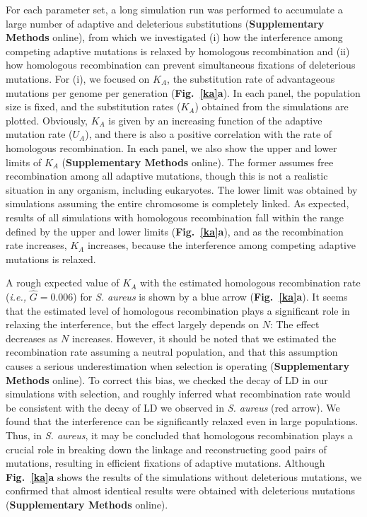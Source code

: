 \documentclass[twoside,twocolumn, letterpaper]{article}
\begin{document}
For each parameter set, a long simulation run was performed to accumulate a large number of adaptive and deleterious substitutions ({\bf Supplementary Methods} online), from which we investigated (i) how the interference among competing adaptive mutations is relaxed by homologous recombination and (ii) how homologous recombination can prevent simultaneous fixations of deleterious mutations. For (i), we focused on $K_A$, the substitution rate of advantageous mutations per genome per generation ({\bf Fig.~\ref{ka}a}). In each panel, the population size is fixed, and the substitution rates ($K_A$) obtained from the simulations are plotted. Obviously, $K_A$ is given by an increasing function of the adaptive mutation rate ($U_{A}$), and there is also a positive correlation with the rate of homologous recombination. In each panel, we also show the upper and lower limits of $K_A$ ({\bf Supplementary Methods} online). The former assumes free recombination among all adaptive mutations, though this is not a realistic situation in any organism, including eukaryotes. The lower limit was obtained by simulations assuming the entire chromosome is completely linked. As expected, results of all simulations with homologous recombination fall within the range defined by the upper and lower limits ({\bf Fig.~\ref{ka}a}), and as the recombination rate increases, $K_A$ increases, because the interference among competing adaptive mutations is relaxed. 

A rough expected value of $K_A$ with the estimated homologous recombination rate (\emph{i.e.,} $\hat{G}=0.006$) for \emph{S. aureus} is shown by a blue arrow ({\bf Fig.~\ref{ka}a}). It seems that the estimated level of homologous recombination plays a significant role in relaxing the interference, but the effect largely depends on $N$: The effect decreases as $N$ increases. However, it should be noted that we estimated the recombination rate assuming a neutral population, and that this assumption causes a serious underestimation when selection is operating ({\bf Supplementary Methods} online). To correct this bias, we checked the decay of LD in our simulations with selection, and roughly inferred what recombination rate would be consistent with the decay of LD we observed in \emph{S. aureus} (red arrow). We found that the interference can be significantly relaxed even in large populations. Thus, in \emph{S. aureus}, it may be concluded that homologous recombination plays a crucial role in breaking down the linkage and reconstructing good pairs of mutations, resulting in efficient fixations of adaptive mutations. Although {\bf Fig.~\ref{ka}a} shows the results of the simulations without deleterious mutations, we confirmed that almost identical results were obtained with deleterious mutations ({\bf Supplementary Methods} online). 
\end{document}
